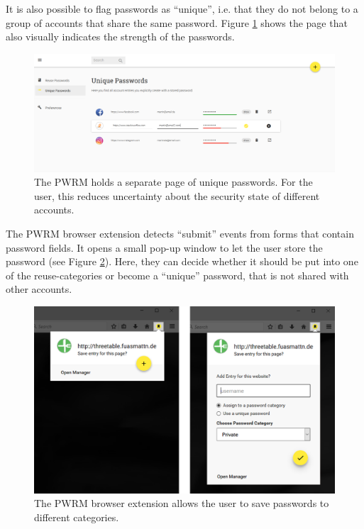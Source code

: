 It is also possible to flag passwords as ``unique'', i.e. that they do not belong to a group of accounts that share the same password. Figure \ref{fig:pwrm:entry-unique} shows the page that also visually indicates the strength of the passwords. 

\begin{figure}[htbp]
	\centering
	\includegraphics[width=\linewidth]{figures/pwrm/entry-unique}
	\caption{The PWRM holds a separate page of unique passwords. For the user, this reduces uncertainty about the security state of different accounts.}
	\label{fig:pwrm:entry-unique}
\end{figure}

The PWRM browser extension detects ``submit'' events from forms that contain password fields. It opens a small pop-up window to let the user store the password (see Figure \ref{fig:pwrm:extension-popus}). Here, they can decide whether it should be put into one of the reuse-categories or become a ``unique'' password, that is not shared with other accounts.

\begin{figure}[htbp]
	\centering
	\includegraphics[width=0.9\linewidth]{figures/pwrm/extension-popus}
	\caption{The PWRM browser extension allows the user to save passwords to different categories.}
	\label{fig:pwrm:extension-popus}
\end{figure}


